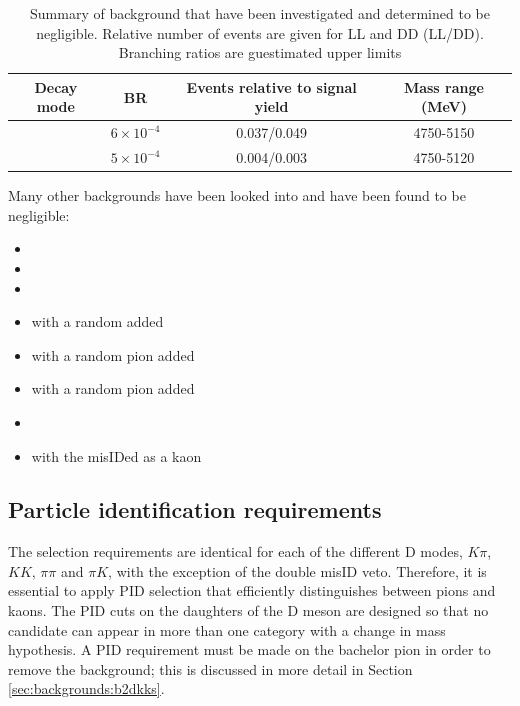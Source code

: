 \begin{table}[h]
\centering
\begin{tabular}{cccc}
\hline
Decay mode & BR & Events relative to signal yield & Mass range (MeV) \\
\hline
\decay{\Bm}{\Dz\Kstarm\piz} & $6 \times 10^{-4}$ & 0.037/0.049 & 4750-5150 \\
\decay{\Bs}{\Dz\KS\pi\pi} & $5 \times 10^{-4}$ & 0.004/0.003 & 4750-5120 \\
\hline
\end{tabular}
\caption{Summary of background that have been investigated and determined to be negligible. Relative number of events are given for LL and DD (LL/DD). Branching ratios are guestimated upper limits}
\label{ignoredbackgrounds}
\end{table}


Many other backgrounds have been looked into and have been found to be negligible:

\begin{itemize}
\item \decay{\Bs}{\Dzb\Kstarz(\Kstarp[\pim])}
\item \decay{\Bs}{\Dstarp\Kstarp}
\item \decay{\Bs}{\Dspm(\kaon\kaon\pi)\Kstarpm}
\item \decay{\Bu}{\D\pi} with a random \KS added
\item \decay{\Bd}{\D\KS} with a  random pion added
\item \decay{\Bs}{\D\KS} with a random pion added
\item \decay{\Bu}{\D(\KS\pi\pi)\Kp}
\item {} with the \proton misIDed as a kaon
\end{itemize}


\subsection{Particle identification requirements}
\label{sec:selection:pid}

The selection requirements are identical for each of the different D modes, $K\pi$, $KK$, $\pi\pi$ and $\pi K$, with the exception of the double misID veto. Therefore, it is essential to apply PID selection that efficiently distinguishes between pions and kaons. The PID cuts on the daughters of the D meson are designed so that no  candidate can appear in more than one category with a change in mass hypothesis. A PID requirement must be made on the bachelor pion in order to remove the \decay{\B}{\D\KS\kaon} background; this is discussed in more detail in Section \ref{sec:backgrounds:b2dkks}. 

